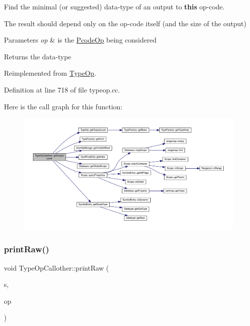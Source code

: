 Find the minimal (or suggested) data-\/type of an output to {\bfseries{this}} op-\/code. 

The result should depend only on the op-\/code itself (and the size of the output) 
\begin{DoxyParams}{Parameters}
{\em op} & is the \mbox{\hyperlink{class_pcode_op}{Pcode\+Op}} being considered \\
\hline
\end{DoxyParams}
\begin{DoxyReturn}{Returns}
the data-\/type 
\end{DoxyReturn}


Reimplemented from \mbox{\hyperlink{class_type_op_a3454cadfb15f6794829123a7ecfe38f5}{Type\+Op}}.



Definition at line 718 of file typeop.\+cc.

Here is the call graph for this function\+:
\nopagebreak
\begin{figure}[H]
\begin{center}
\leavevmode
\includegraphics[width=350pt]{class_type_op_callother_a7040d3f5ac8b93796627304da778250f_cgraph}
\end{center}
\end{figure}
\mbox{\label{class_type_op_callother_ad663593c2bd0654a4ce68d8aa8a3b179}} 
\subsubsection{\texorpdfstring{printRaw()}{printRaw()}}
{\footnotesize\ttfamily void Type\+Op\+Callother\+::print\+Raw (\begin{DoxyParamCaption}\item[{ostream \&}]{s,  }\item[{const \mbox{\hyperlink{class_pcode_op}{Pcode\+Op}} $\ast$}]{op }\end{DoxyParamCaption})\hspace{0.3cm}{\ttfamily [virtual]}}



